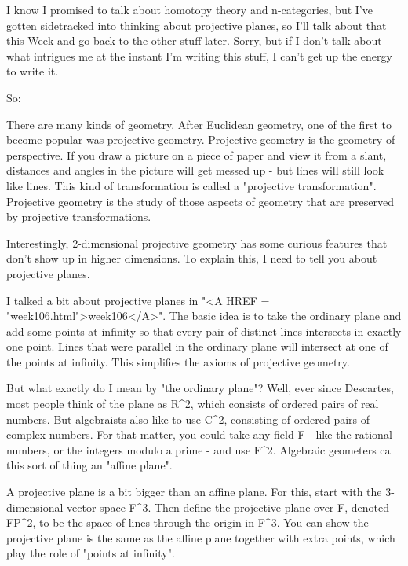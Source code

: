 


I know I promised to talk about homotopy theory and n-categories, but 
I've gotten sidetracked into thinking about projective planes, so I'll 
talk about that this Week and go back to the other stuff later.  Sorry, 
but if I don't talk about what intrigues me at the instant I'm writing
this stuff, I can't get up the energy to write it.  

So:

There are many kinds of geometry.  After Euclidean geometry, one of the
first to become popular was projective geometry.   Projective geometry
is the geometry of perspective.  If you draw a picture on a piece of
paper and view it from a slant, distances and angles in the picture will
get messed up - but lines will still look like lines.  This kind of
transformation is called a "projective transformation".  Projective
geometry is the study of those aspects of geometry that are preserved
by projective transformations.

Interestingly, 2-dimensional projective geometry has some curious
features that don't show up in higher dimensions.  To explain this,  
I need to tell you about projective planes.

I talked a bit about projective planes in "<A HREF = "week106.html">week106</A>".  The basic idea is
to take the ordinary plane and add some points at infinity so that every
pair of distinct lines intersects in exactly one point.  Lines that were
parallel in the ordinary plane will intersect at one of the points at
infinity.  This simplifies the axioms of projective geometry.

But what exactly do I mean by "the ordinary plane"?  Well, ever since
Descartes, most people think of the plane as R^{2}, which consists of
ordered pairs of real numbers.  But algebraists also like to use C^{2},
consisting of ordered pairs of complex numbers.  For that matter, you
could take any field F - like the rational numbers, or the integers 
modulo a prime - and use F^{2}.  Algebraic geometers call this sort of
thing an "affine plane".  

A projective plane is a bit bigger than an affine plane.  For this,
start with the 3-dimensional vector space F^{3}.  Then define the
projective plane over F, denoted FP^{2}, to be the space of lines 
through the origin in F^{3}.  
You can show the projective plane is the same as
the affine plane together with extra points, which play the role of 
"points at infinity".


